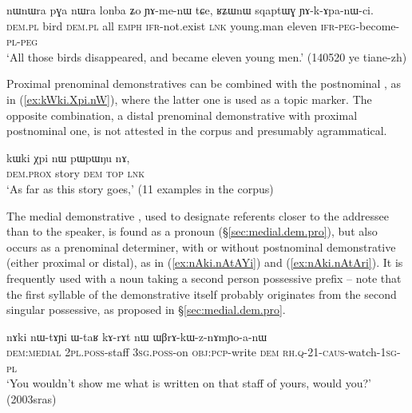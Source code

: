 \begin{exe}
\ex \label{ex:nWnWra.pGa.nWra}
 \gll nɯnɯra pɣa nɯra lonba ʑo ɲɤ-me-nɯ tɕe, ʁʑɯnɯ sqaptɯɣ ɲɤ-k-ɤpa-nɯ-ci. \\
 \textsc{dem}.\textsc{pl} bird  \textsc{dem}.\textsc{pl}  all \textsc{emph} \textsc{ifr}-not.exist \textsc{lnk} young.man eleven \textsc{ifr}-\textsc{peg}-become-\textsc{pl}-\textsc{peg} \\
 \glt `All those birds disappeared, and became eleven young men.' (140520 ye tiane-zh)
\end{exe}

Proximal prenominal demonstratives can be combined with the postnominal , as in (\ref{ex:kWki.Xpi.nW}), where the latter one is used as a topic marker. The opposite combination, a distal prenominal demonstrative with proximal postnominal one, is not attested in the corpus and presumably agrammatical.

\begin{exe}
\ex \label{ex:kWki.Xpi.nW}
 \gll kɯki χpi nɯ pɯpɯŋu nɤ,  \\
 \textsc{dem}.\textsc{prox} story \textsc{dem} \textsc{top} \textsc{lnk} \\
 \glt `As far as this story goes,' (11 examples in the corpus)
\end{exe}

The medial demonstrative , used to designate referents closer to the addressee than to the speaker, is found as a pronoun (§\ref{sec:medial.dem.pro}), but also occurs as a prenominal determiner, with or without postnominal demonstrative (either proximal or distal), as in (\ref{ex:nAki.nAtAYi}) and (\ref{ex:nAki.nAtAri}). It is frequently used with a noun taking a second person possessive prefix -- note that the first syllable  of the demonstrative  itself probably originates from the second singular possessive, as proposed in §\ref{sec:medial.dem.pro}.

\begin{exe}
\ex \label{ex:nAki.nAtAYi}
 \gll nɤki nɯ-tɤɲi ɯ-taʁ kɤ-rɤt nɯ ɯβrɤ-kɯ-z-nɤmɲo-a-nɯ \\
 \textsc{dem}:\textsc{medial} \textsc{2pl}.\textsc{poss}-staff \textsc{3sg}.\textsc{poss}-on \textsc{obj}:\textsc{pcp}-write \textsc{dem} \textsc{rh}.\textsc{q}-2\fl{}1-\textsc{caus}-watch-\textsc{1sg}-\textsc{pl} \\
 \glt `You wouldn't show me what is written on that staff of yours, would you?' (2003sras)
\end{exe}

